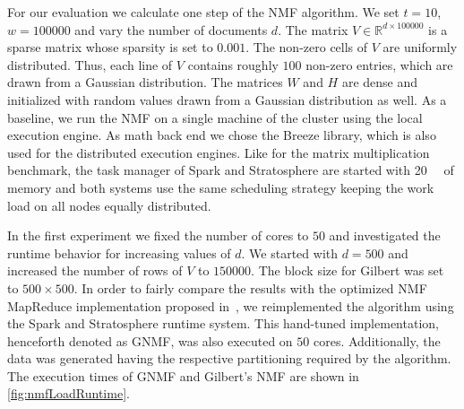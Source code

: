 For our evaluation we calculate one step of the NMF algorithm.
We set $t=10$, $w=100000$ and vary the number of documents $d$.
The matrix $V\in\mathbb{R}^{d\times 100000}$ is a sparse matrix whose sparsity is set to $0.001$.
The non-zero cells of $V$ are uniformly distributed.
Thus, each line of $V$ contains roughly $100$ non-zero entries, which are drawn from a Gaussian distribution.
The matrices $W$ and $H$ are dense and initialized with random values drawn from a Gaussian distribution as well.
As a baseline, we run the NMF on a single machine of the cluster using the local execution engine.
As math back end we chose the Breeze library, which is also used for the distributed execution engines.
Like for the matrix multiplication benchmark, the task manager of Spark and Stratosphere are started with \SI{20}{\giga\byte} of memory and both systems use the same scheduling strategy keeping the work load on all nodes equally distributed.

In the first experiment we fixed the number of cores to $50$ and investigated the runtime behavior for increasing values of $d$.
We started with $d=500$ and increased the number of rows of $V$ to $150000$.
The block size for Gilbert was set to $500 \times 500$.
In order to fairly compare the results with the optimized NMF MapReduce implementation proposed in~\cite{liu:2010a}, we reimplemented the algorithm using the Spark and Stratosphere runtime system.
This hand-tuned implementation, henceforth denoted as GNMF, was also executed on $50$ cores.
Additionally, the data was generated having the respective partitioning required by the algorithm.
The execution times of GNMF and Gilbert's NMF are shown in \cref{fig:nmfLoadRuntime}.

